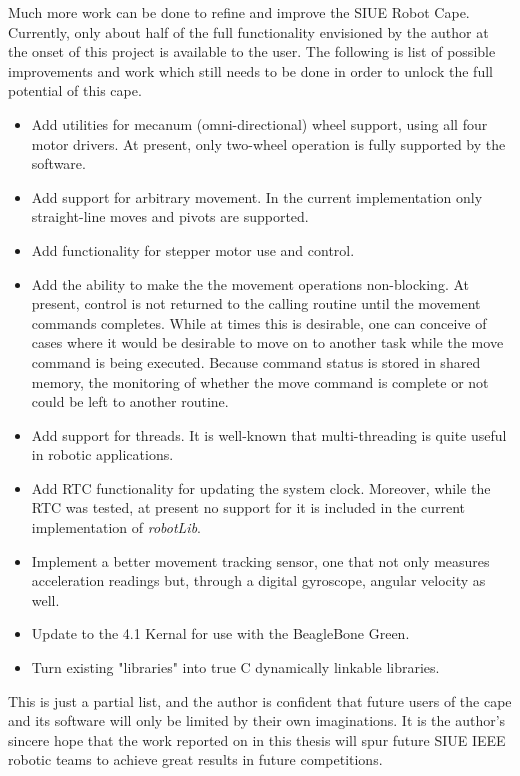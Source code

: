 \documentclass[12pt,oneside,final]{siuethesis}
\theoremstyle{definition}
\begin{document}
Much more work can be done to refine and improve the SIUE Robot Cape. Currently, only about half of the full functionality envisioned by the author at the onset of this project is available to the user. The following is list of possible improvements and work which still needs to be done in order to unlock the full potential of this cape.
\begin{itemize}
\item 
Add utilities for mecanum (omni-directional) wheel support, using all four motor drivers. At present, only two-wheel operation is fully supported by the software.
\item
Add support for arbitrary movement. In the current implementation only straight-line moves and pivots are supported.
\item 
Add functionality for stepper motor use and control.
\item
 Add the ability to make the the movement operations non-blocking. At present, control is not returned to the calling routine until the movement commands completes.  While at times this is desirable, one can conceive of cases where it would be desirable to move on to another task while the move command is being executed.  Because command status is stored in shared memory, the monitoring of whether the move command is complete or not could be left to another routine.  
\item
Add support for threads.  It is well-known that multi-threading is quite useful in robotic applications.
\item 
Add RTC functionality for updating the system clock.  Moreover, while the RTC was tested, at present no support for it is included in the current implementation of \emph{robotLib}.
\item 
Implement a better movement tracking sensor, one that not only measures acceleration readings but, through a digital gyroscope, angular velocity as well.
\item 
Update to the 4.1 Kernal for use with the BeagleBone Green.
\item 
Turn existing "libraries" into true C dynamically linkable libraries.
\end{itemize}

This is just a partial list, and the author is confident that future users of the cape and its software will only be limited by their own imaginations.  It is the author's sincere hope that the work reported on in this thesis will spur future SIUE IEEE robotic teams to achieve great results in future competitions.
\end{document}
